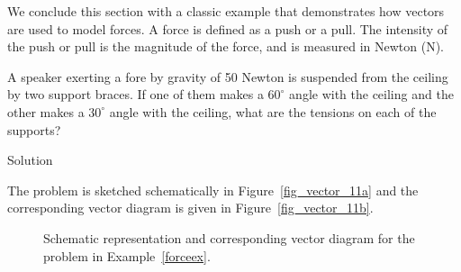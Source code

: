 We conclude this section with a classic example that demonstrates how vectors are used to model forces.  A force is defined as a push or a pull.   The intensity of the push or pull is the magnitude of the force, and is  measured in Newton (N).

\begin{example} \label{forceex}
  A  speaker exerting a fore by gravity of 50 Newton is  suspended from the ceiling by two support braces.   If one of them makes a $60^{\circ}$ angle with the ceiling and the other makes a $30^{\circ}$ angle with the ceiling, what are the tensions on each of the supports?


Solution 

The problem is sketched schematically in Figure~\ref{fig_vector_11a} and  the corresponding vector diagram is given in Figure~\ref{fig_vector_11b}. 

\begin{figure}[H]
\centering
\centerline{
\hspace{0.1cm}
}
\caption{Schematic representation and corresponding vector diagram for the problem in Example~\ref{forceex}. }

\end{figure}


\end{example}
